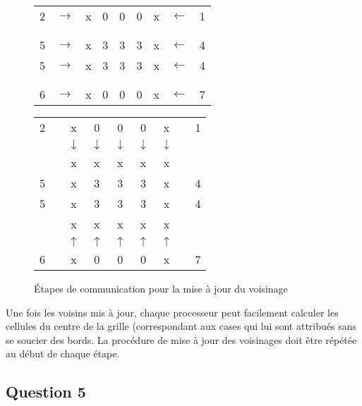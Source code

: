 \documentclass{article}
\begin{document}
\begin{figure}[!ht]
\begin{center}
\begin{tabular}{cc||c|c|c|c|c||cc}
	2 & $\rightarrow$ & x & 0 & 0 & 0 & x & $\leftarrow$ & 1 \\
	  &   &   &   &   &   &   &   &   \\
	\hline \hline
	  &   &   &   &   &   &   &   &   \\
	\hline
	5 & $\rightarrow$ & x & 3 & 3 & 3 & x & $\leftarrow$ & 4 \\
	\hline
	5 & $\rightarrow$ & x & 3 & 3 & 3 & x & $\leftarrow$ & 4 \\
	\hline
	  &   &   &   &   &   &   &   &   \\
	\hline \hline
	  &   &   &   &   &   &   &   &   \\
	6 & $\rightarrow$ & x & 0 & 0 & 0 & x & $\leftarrow$ & 7 \\
\end{tabular}
\hspace{1cm}
\begin{tabular}{cc||c|c|c|c|c||cc}
	2 &   & x & 0 & 0 & 0 & x &   & 1 \\
	  &   & $\downarrow$ & $\downarrow$ & $\downarrow$ & $\downarrow$ & $\downarrow$ &   &   \\
	\hline\hline
	  &   & x & x & x & x & x &   &   \\
	\hline
	5 &   & x & 3 & 3 & 3 & x &   & 4 \\
	\hline
	5 &   & x & 3 & 3 & 3 & x &   & 4 \\
	\hline
	  &   & x & x & x & x & x &   &   \\
	\hline\hline
	  &   & $\uparrow$ & $\uparrow$ & $\uparrow$ & $\uparrow$ & $\uparrow$ &   &   \\
	6 &   & x & 0 & 0 & 0 & x &   & 7 \\
\end{tabular}
\end{center}
\caption{Étapes de communication pour la mise à jour du voisinage}
\end{figure}

\par Une fois les voisins mis à jour, chaque processeur peut facilement calculer les cellules du centre de la grille (correspondant aux cases qui lui sont attribués sans se soucier des bords. La procédure de mise à jour des voisinages doit être répétée au début de chaque étape.

\subsection*{Question 5}
\end{document}
